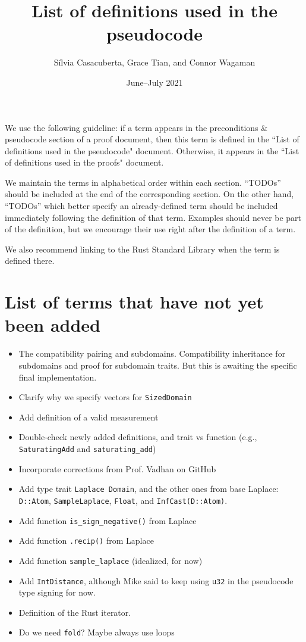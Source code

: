 \documentclass[11pt,a4paper]{article}
\title{List of definitions used in the pseudocode}
\author{S\'ilvia Casacuberta, Grace Tian, and Connor Wagaman}
\date{June--July 2021}
\theoremstyle{definition}
\begin{document}
\maketitle

We use the following guideline: if a term appears in the preconditions \& pseudocode section of a proof document, then this term is defined in the ``List of definitions used in the pseudocode" document. Otherwise, it appears in the ``List of definitions used in the proofs" document. 

We maintain the terms in alphabetical order within each section. ``TODOs'' should be included at the end of the corresponding section. On the other hand, ``TODOs'' which better specify an already-defined term should be included immediately following the definition of that term. Examples should never be part of the definition, but we encourage their use right after the definition of a term.

We also recommend linking to the Rust Standard Library when the term is defined there.

\tableofcontents

\section*{List of terms that have not yet been added}
\begin{itemize}
    \item The compatibility pairing and subdomains. Compatibility inheritance for subdomains and proof for subdomain traits. But this is awaiting the specific final implementation.
    \item Clarify why we specify vectors for \texttt{SizedDomain}
    \item Add definition of a valid measurement
    \item Double-check newly added definitions, and trait vs function (e.g., \texttt{SaturatingAdd} and \texttt{saturating\_add})
    \item Incorporate corrections from Prof. Vadhan on GitHub
    \item Add type trait \texttt{Laplace Domain}, and the other ones from base Laplace: \texttt{D::Atom}, \texttt{SampleLaplace}, \texttt{Float}, and \texttt{InfCast(D::Atom)}.
    \item Add function \texttt{is\_sign\_negative()} from Laplace
    \item Add function \texttt{.recip()} from Laplace
    \item Add function \texttt{sample\_laplace} (idealized, for now)
    \item Add \texttt{IntDistance}, although Mike said to keep using \texttt{u32} in the pseudocode type signing for now.
    \item Definition of the Rust iterator.
    \item Do we need \texttt{fold}? Maybe always use loops
\end{itemize}
\end{document}
